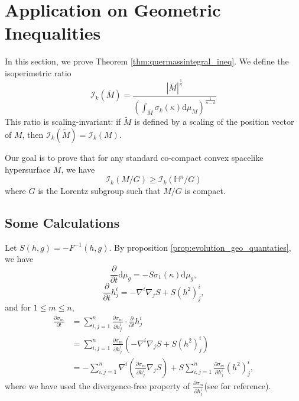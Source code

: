 \documentclass[10pt,a4paper]{amsart}
\newcommand{\abs}[1]{\left\lvert{#1}\right\rvert}
\newcommand{\dd}{\ensuremath{\text{d}}}
\renewcommand{\H}{{\mathbb{H}}}
\newcommand{\pd}[2]{\frac{\partial {#1}}{\partial {#2}}}
\numberwithin{equation}{section}
\begin{document}
\section{Application on Geometric Inequalities}
In this section, we prove Theorem \ref{thm:quermassintegral_ineq}. We define the isoperimetric ratio 
\begin{equation}
    \mathcal{I}_k(\overline{M}) = \frac{\abs{\overline{M}}^{\frac{1}{n}}}{\left( \int_{\overline{M}} \sigma_k(\kappa) \dd \mu_M \right)^{\frac{1}{n-k}}}
\end{equation}
This ratio is scaling-invariant: if \(\widetilde{M}\) is defined by a scaling of the position vector of \(M\), then \(\mathcal{I}_k(\widetilde{M}) = \mathcal{I}_k(M)\). 

Our goal is  to prove that for any standard co-compact convex spacelike hypersurface \(M\), we have
\begin{equation}
    \mathcal{I}_k(M / G) \geq \mathcal{I}_k(\H^n / G)
\end{equation}
where \(G\) is the Lorentz subgroup such that \(M / G\) is compact. 

\subsection{Some Calculations}
Let \(S(h,g) = -F^{-1}(h,g)\). By proposition \ref{prop:evolution_geo_quantaties}, we have 
\begin{equation}
    \pd{}{t}\dd \mu_g = -S\sigma_1(\kappa)\dd \mu_g,
\end{equation}
\begin{equation}
    \pd{}{t}h_j^i = -\nabla^i\nabla_j S + S(h^2)_j^i,
\end{equation}
and for \(1\leq m\leq n\),
\begin{equation}
    \begin{aligned}
        \pd{\sigma_m}{t} &= \sum_{i,j=1}^{n} \pd{\sigma_m}{h_j^i}\cdot\pd{}{t}h_j^i \\
        &= \sum_{i,j=1}^{n} \pd{\sigma_m}{h_j^i}\left( -\nabla^i\nabla_j S + S(h^2)_j^i \right) \\
        &= -\sum_{i,j=1}^{n} \nabla^i\left(\pd{\sigma_m}{h_j^i} \nabla_j S \right) + S\sum_{i,j=1}^{n} \pd{\sigma_m}{h_j^i}(h^2)_j^i,
    \end{aligned}
\end{equation}
where we have used the divergence-free property of \(\pd{\sigma_m}{h_j^i}\)(see \cite{R.Reilly1974} for reference).
\end{document}
